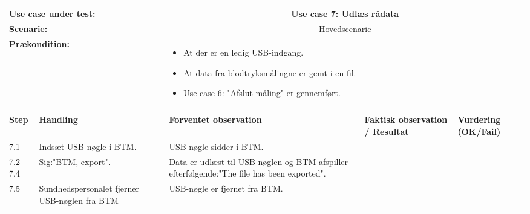 \begin{tabular}{|p{1cm}|p{3cm}|p{4cm}|p{4cm}|p{2cm}|}
\hline
\multicolumn{2}{|p{3cm}|}{\textbf{Use case under test:}} & \multicolumn{3}{c|}{Use case 7: Udlæs rådata} \\\hline

\multicolumn{2}{|p{3cm}|}{\textbf{Scenarie:}} & \multicolumn{3}{c|}{Hovedscenarie} \\\hline

\multicolumn{2}{|p{3cm}|}{\textbf{Prækondition:}}  & \multicolumn{3}{l|}{\parbox{0.6\textwidth}{
\begin{itemize}[label=$\circ$]
\item At der er en ledig USB-indgang.
\item At data fra blodtryksmålingne er gemt i en fil. 
\item Use case 6: "Afslut måling" er gennemført. 
\end{itemize} }}\\\hline

\multicolumn{5}{|c|}{} \\\hline

\textbf{Step} & \textbf{Handling} & \textbf{Forventet observation} & \textbf{Faktisk observation / Resultat} & \textbf{Vurdering (OK/Fail)}\\\hline

7.1 & Indsæt USB-nøgle i BTM. & USB-nøgle sidder i BTM. &  & \\\hline

7.2-7.4 & Sig:"BTM, export". & Data er udlæst til USB-nøglen og BTM afspiller efterfølgende:"The file has been exported". &  & \\\hline

7.5 & Sundhedspersonalet fjerner USB-nøglen fra BTM & USB-nøgle er fjernet fra BTM. &  & \\\hline

\end{tabular}




